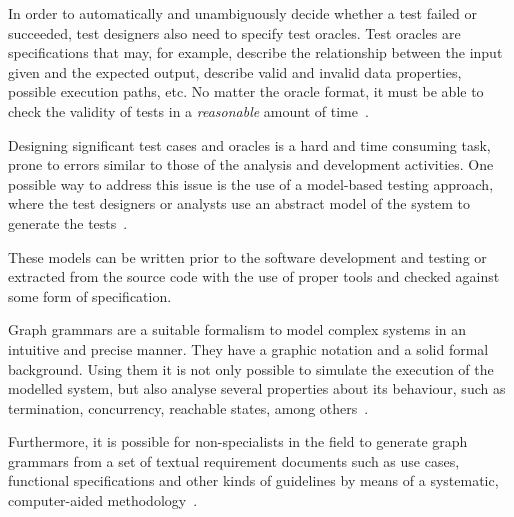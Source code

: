 In order to automatically and unambiguously decide whether a test failed or succeeded, test designers also need to specify test oracles. Test oracles are specifications that may, for example, describe the relationship between the input given and the expected output, describe valid and invalid data properties, possible execution paths, etc. No matter the oracle format, it must be able to check the validity of tests in a \textit{reasonable} amount of time~\cite{Weyuker1982}.

Designing significant test cases and oracles is a hard and time consuming task, prone to errors similar to those of the analysis and development activities. One possible way to address this issue is the use of a model-based testing approach, where the test designers or analysts use an abstract model of the system to generate the tests~\cite{Utting2006}. 

These models can be written prior to the software development and testing or extracted from the source code with the use of proper tools and checked against some form of specification. 

Graph grammars are a suitable formalism to model complex systems in an intuitive and precise manner. They have a graphic notation and a solid formal background.  Using them it is not only possible to simulate the execution of the modelled system, but also analyse several properties about its behaviour, such as termination, concurrency, reachable states, among others~\cite{Ehrig2006}. 


Furthermore, it is possible for non-specialists in the field to generate graph grammars from a set of textual requirement documents such as use cases, functional specifications and other kinds of guidelines by means of a systematic, computer-aided methodology~\cite{Junior2015,BezerraWEIT2016,Cota2017}.

